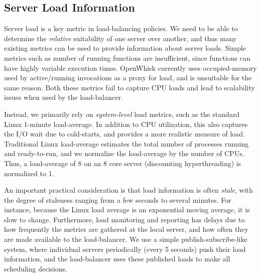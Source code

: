 \vspace*{-0.2cm}
\subsection{Server Load Information}

Server load is a key metric in load-balancing policies.
We need to be able to determine the \emph{relative} suitability of one server over another, and thus many existing metrics can be used to provide information about server loads.
%
Simple metrics such as number of running functions are insufficient, since functions can have highly variable execution times. 
OpenWhisk currently uses occupied-memory used by active/running invocations as a proxy for load, and is unsuitable for the same reason. 
Both these metrics fail to capture CPU loads and lead to scalability issues when used by the load-balancer. 




Instead, we primarily rely on \emph{system-level} load metrics, such as the standard Linux 1-minute load-average.
In addition to CPU utilization, this also captures the I/O wait due to cold-starts, and provides a more realistic measure of load.
Traditional Linux load-average estimates the total number of processes running and ready-to-run, and we normalize the load-average by the number of CPUs. 
Thus, a load-average of $8$ on an 8 core server (discounting hyperthreading) is normalized to 1. 

An important practical consideration is that load information is often \emph{stale}, with the degree of staleness ranging from a few seconds to several minutes. 
For instance, because the Linux load average is an exponential moving average, it is slow to change.
Furthermore, load monitoring and reporting has delays due to how frequently the metrics are gathered at the local server, and how often they are made available to the load-balancer.
We use a simple publish-subscribe-like system, where individual servers periodically (every 5 seconds) push their load information, and the load-balancer uses these published loads to make all scheduling decisions.


